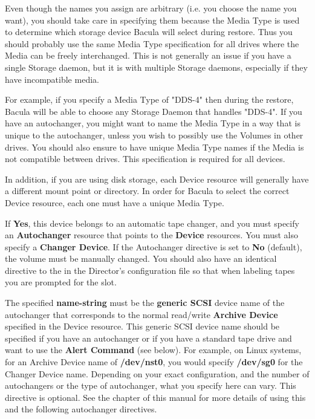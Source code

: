 \begin{description}
   Even though the names you assign are arbitrary (i.e.  you choose the name
   you want), you should take care in specifying them because the Media Type
   is used to determine which storage device Bacula will select during
   restore.  Thus you should probably use the same Media Type specification
   for all drives where the Media can be freely interchanged.  This is not
   generally an issue if you have a single Storage daemon, but it is with
   multiple Storage daemons, especially if they have incompatible media.
   
   For example, if you specify a Media Type of "DDS-4" then during the
   restore, Bacula will be able to choose any Storage Daemon that handles
   "DDS-4".  If you have an autochanger, you might want to name the Media Type
   in a way that is unique to the autochanger, unless you wish to possibly use
   the Volumes in other drives.  You should also ensure to have unique Media
   Type names if the Media is not compatible between drives.  This
   specification is required for all devices.

   In addition, if you are using disk storage, each Device resource will
   generally have a different mount point or directory. In order for
   Bacula to select the correct Device resource, each one must have a
   unique Media Type.

\label{Autochanger}
\item [Autochanger = {\it yes\vb{}no}]
   If {\bf Yes}, this device belongs to an automatic tape changer, and you
   must specify an {\bf Autochanger} resource that points to the {\bf
   Device} resources.  You must also specify a 
   {\bf Changer Device}.  If the Autochanger directive is set to {\bf
   No} (default), the volume must be manually changed.  You should also
   have an identical directive to the  
     in the Director's
   configuration file so that  when labeling tapes you are prompted for the slot.

\item [Changer Device = {\it name-string}]
   The specified {\bf name-string} must be the {\bf generic SCSI} device
   name of the autochanger that corresponds to the normal read/write
   {\bf Archive Device}  specified in the Device resource. This
   generic SCSI device name should be specified if you have an autochanger 
   or if you have a standard tape drive and want to use the
   {\bf Alert Command} (see below). For example, on Linux systems, for 
   an Archive Device name of {\bf /dev/nst0}, you would specify {\bf
   /dev/sg0} for the Changer Device name. Depending on your exact
   configuration, and the number of autochangers or the type of
   autochanger, what you specify here can vary.  This directive is
   optional.  See the  chapter
   of this manual for more details of using this and the following
   autochanger directives.


\end{description}
